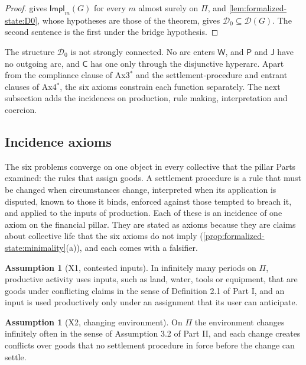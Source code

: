 \documentclass[11pt,letterpaper]{article}
\theoremstyle{definition}
\newtheorem{assumption}[theorem]{Assumption}
\theoremstyle{remark}
\newcommand{\pP}{\mathsf{P}}
\newcommand{\pJ}{\mathsf{J}}
\newcommand{\pC}{\mathsf{C}}
\newcommand{\pW}{\mathsf{W}}
\newcommand{\Impl}{\mathsf{Impl}}
\newcommand{\Dzero}{\mathcal{D}_0}
\begin{document}
\begin{proof}
 gives $\Impl_m(G)$ for every $m$ almost surely on $\Pi$, and \cref{lem:formalized-state:D0}, whose hypotheses are those of the theorem, gives $\Dzero\subseteq\mathcal{D}(G)$. The second sentence is the first under the bridge hypothesis.
\end{proof}

The structure $\Dzero$ is not strongly connected. No arc enters $\pW$, and $\pP$ and $\pJ$ have no outgoing arc, and $\pC$ has one only through the disjunctive hyperarc. Apart from the compliance clause of Ax3$^{*}$ and the settlement-procedure and entrant clauses of Ax4$^{*}$, the six axioms constrain each function separately. The next subsection adds the incidences on production, rule making, interpretation and coercion.

\subsection{Incidence axioms}

The six problems converge on one object in every collective that the pillar Parts examined: the rules that assign goods. A settlement procedure is a rule that must be changed when circumstances change, interpreted when its application is disputed, known to those it binds, enforced against those tempted to breach it, and applied to the inputs of production. Each of these is an incidence of one axiom on the financial pillar. They are stated as axioms because they are claims about collective life that the six axioms do not imply (\cref{prop:formalized-state:minimality}(a)), and each comes with a falsifier.

\begin{assumption}[X1, contested inputs]
\label{ass:formalized-state:X1}
In infinitely many periods on $\Pi$, productive activity uses inputs, such as land, water, tools or equipment, that are goods under conflicting claims in the sense of Definition 2.1 of Part I, and an input is used productively only under an assignment that its user can anticipate.
\end{assumption}

\begin{assumption}[X2, changing environment]
\label{ass:formalized-state:X2}
On $\Pi$ the environment changes infinitely often in the sense of Assumption 3.2 of Part II, and each change creates conflicts over goods that no settlement procedure in force before the change can settle.
\end{assumption}
\end{document}
